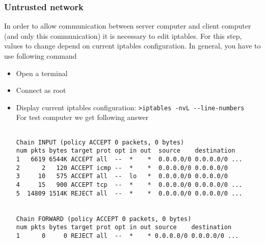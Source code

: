\label{untrusted-network}
\subsubsection{Untrusted network}
In order to allow communication between server computer and client computer (and only this communication) it is necessary to edit iptables.
For this step, values to change depend on current iptables configuration. In general, you have to use following command
\begin{itemize}
\item Open a terminal
\item Connect as root
\item Display current iptables configuration:
\newline
\verb|>iptables -nvL --line-numbers  |
\newline
For test computer we get following answer
\begin{lstlisting}[frame=single]

Chain INPUT (policy ACCEPT 0 packets, 0 bytes)
num pkts bytes target prot opt in out  source    destination         
1   6619 6544K ACCEPT all  --  *    *  0.0.0.0/0 0.0.0.0/0 ...
2      2   120 ACCEPT icmp --  *    *  0.0.0.0/0 0.0.0.0/0           
3     10   575 ACCEPT all  --  lo   *  0.0.0.0/0 0.0.0.0/0           
4     15   900 ACCEPT tcp  --  *    *  0.0.0.0/0 0.0.0.0/0 ...
5  14809 1514K REJECT all  --  *    *  0.0.0.0/0 0.0.0.0/0 ...
																														

Chain FORWARD (policy ACCEPT 0 packets, 0 bytes)
num pkts bytes target prot opt in out source    destination         
1      0     0 REJECT all  --  *    * 0.0.0.0/0 0.0.0.0/0 ...


\end{lstlisting}
\end{itemize}
